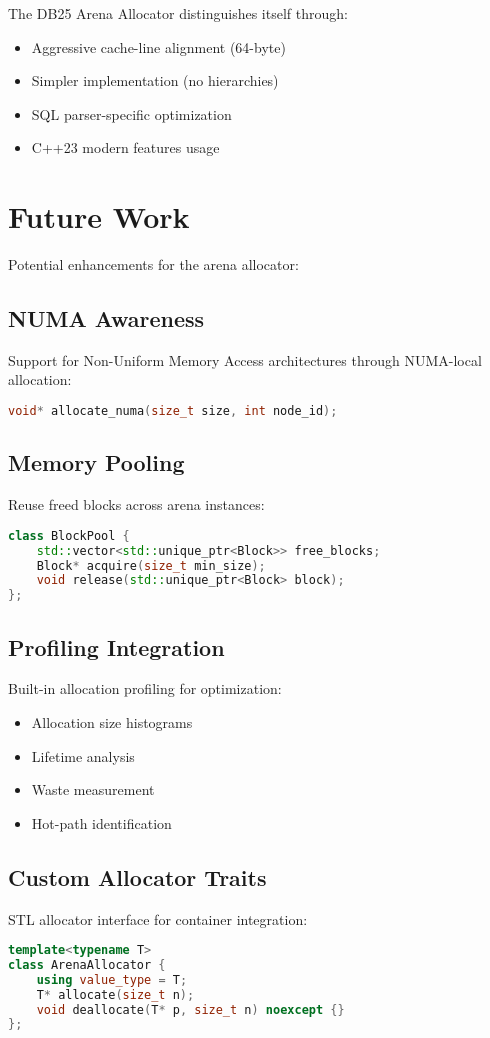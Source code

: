 \documentclass[11pt,a4paper]{article}
\begin{document}
The DB25 Arena Allocator distinguishes itself through:
\begin{itemize}
    \item Aggressive cache-line alignment (64-byte)
    \item Simpler implementation (no hierarchies)
    \item SQL parser-specific optimization
    \item C++23 modern features usage
\end{itemize}

\section{Future Work}

Potential enhancements for the arena allocator:

\subsection{NUMA Awareness}
Support for Non-Uniform Memory Access architectures through NUMA-local allocation:
\begin{lstlisting}[language=C++]
void* allocate_numa(size_t size, int node_id);
\end{lstlisting}

\subsection{Memory Pooling}
Reuse freed blocks across arena instances:
\begin{lstlisting}[language=C++]
class BlockPool {
    std::vector<std::unique_ptr<Block>> free_blocks;
    Block* acquire(size_t min_size);
    void release(std::unique_ptr<Block> block);
};
\end{lstlisting}

\subsection{Profiling Integration}
Built-in allocation profiling for optimization:
\begin{itemize}
    \item Allocation size histograms
    \item Lifetime analysis
    \item Waste measurement
    \item Hot-path identification
\end{itemize}

\subsection{Custom Allocator Traits}
STL allocator interface for container integration:
\begin{lstlisting}[language=C++]
template<typename T>
class ArenaAllocator {
    using value_type = T;
    T* allocate(size_t n);
    void deallocate(T* p, size_t n) noexcept {}
};
\end{lstlisting}
\end{document}

